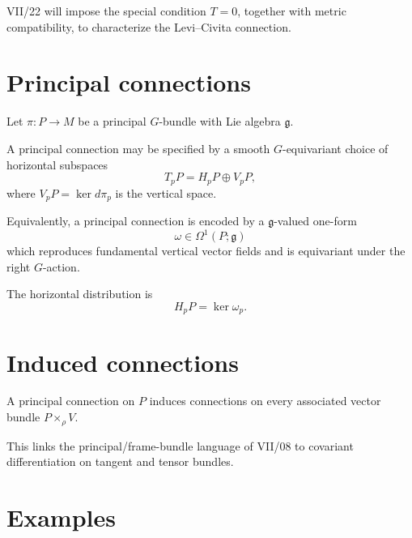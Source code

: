 \begin{remark}
VII/22 will impose the special condition \(T=0\), together with metric
compatibility, to characterize the Levi--Civita connection.
\end{remark}

\section{Principal connections}

Let \(\pi:P\to M\) be a principal \(G\)-bundle with Lie algebra \(\mathfrak g\).

\begin{definition}\label{def:vii21-horizontal}
A principal connection may be specified by a smooth \(G\)-equivariant choice of
horizontal subspaces
\[
T_pP=H_pP\oplus V_pP,
\]
where \(V_pP=\ker d\pi_p\) is the vertical space.
\end{definition}

\begin{definition}\label{def:vii21-principal-form}
Equivalently, a principal connection is encoded by a
\(\mathfrak g\)-valued one-form
\[
\omega\in\Omega^1(P;\mathfrak g)
\]
which reproduces fundamental vertical vector fields and is equivariant under the
right \(G\)-action.
\end{definition}

\begin{proposition}\label{prop:vii21-horizontal-kernel}
The horizontal distribution is
\[
H_pP=\ker\omega_p.
\]
\end{proposition}

\section{Induced connections}

\begin{proposition}\label{prop:vii21-associated}
A principal connection on \(P\) induces connections on every associated vector
bundle \(P\times_\rho V\).
\end{proposition}

\begin{remark}
This links the principal/frame-bundle language of VII/08 to covariant
differentiation on tangent and tensor bundles.
\end{remark}

\section{Examples}

